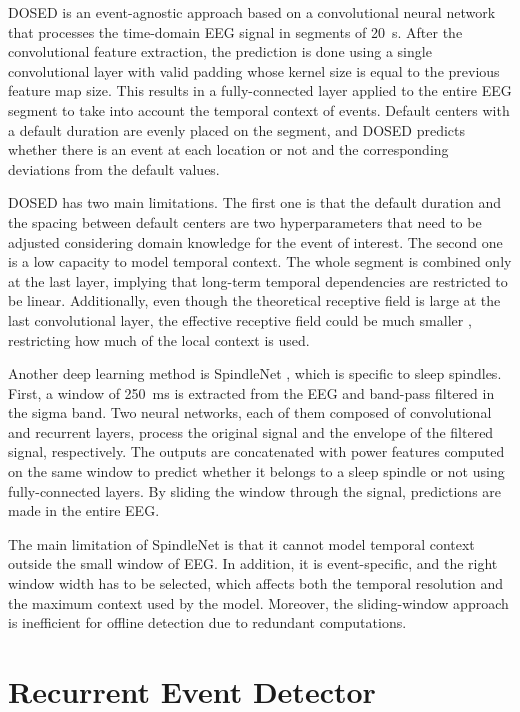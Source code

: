\documentclass[conference]{IEEEtran}
\begin{document}
DOSED \cite{chambon2019dosed} is an event-agnostic approach based on a convolutional neural network that processes the time-domain EEG signal in segments of 20~s. After the convolutional feature extraction, the prediction is done using a single convolutional layer with valid padding whose kernel size is equal to the previous feature map size. This results in a fully-connected layer applied to the entire EEG segment to take into account the temporal context of events. Default centers with a default duration are evenly placed on the segment, and DOSED predicts whether there is an event at each location or not and the corresponding deviations from the default values.

DOSED has two main limitations. The first one is that the default duration and the spacing between default centers are two hyperparameters that need to be adjusted considering domain knowledge for the event of interest. The second one is a low capacity to model temporal context. The whole segment is combined only at the last layer, implying that long-term temporal dependencies are restricted to be linear. Additionally, even though the theoretical receptive field is large at the last convolutional layer, the effective receptive field could be much smaller \cite{luo2016understanding}, restricting how much of the local context is used.

Another deep learning method is SpindleNet \cite{kulkarni2019deep}, which is specific to sleep spindles. First, a window of 250~ms is extracted from the EEG and band-pass filtered in the sigma band. Two neural networks, each of them composed of convolutional and recurrent layers, process the original signal and the envelope of the filtered signal, respectively. The outputs are concatenated with power features computed on the same window to predict whether it belongs to a sleep spindle or not using fully-connected layers. By sliding the window through the signal, predictions are made in the entire EEG. 

The main limitation of SpindleNet is that it cannot model temporal context outside the small window of EEG. In addition, it is event-specific, and the right window width has to be selected, which affects both the temporal resolution and the maximum context used by the model. Moreover, the sliding-window approach is inefficient for offline detection due to redundant computations.

\section{Recurrent Event Detector}
\end{document}
